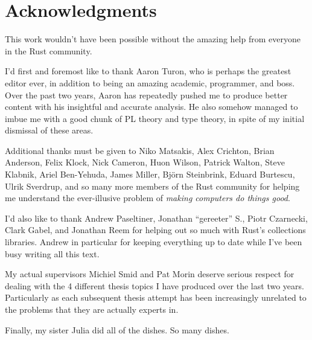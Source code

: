 {}


\bigskip

\begingroup
\let\clearpage\relax
\let\cleardoublepage\relax
\let\cleardoublepage\relax
\chapter*{Acknowledgments}

This work wouldn't have been possible without the amazing help from everyone in
the Rust community.

I'd first and foremost like to thank Aaron Turon, who is perhaps the greatest
editor ever, in addition to being an amazing academic, programmer, and boss.
Over the past two years, Aaron has repeatedly pushed me to produce better content
with his insightful and accurate analysis. He also somehow managed to imbue me with
a good chunk of PL theory and type theory, in spite of my initial dismissal of these
areas.

Additional thanks must be given to Niko Matsakis, Alex Crichton, Brian Anderson,
Felix Klock, Nick Cameron, Huon Wilson, Patrick Walton, Steve Klabnik, Ariel Ben-Yehuda,
James Miller, Björn Steinbrink, Eduard Burtescu, Ulrik Sverdrup, and so many more members of the
Rust community for helping me understand the ever-illusive problem of
\emph{making computers do things good}.

I'd also like to thank Andrew Paseltiner, Jonathan ``gereeter'' S., Piotr Czarnecki,
Clark Gabel, and Jonathan Reem for helping out so much with Rust's collections
libraries. Andrew in particular for keeping everything up to date while I've been
busy writing all this text.

My actual supervisors Michiel Smid and Pat Morin deserve serious respect for
dealing with the 4 different thesis topics I have produced over the last
two years. Particularly as each subsequent thesis attempt has been increasingly
unrelated to the problems that they are actually experts in.

Finally, my sister Julia did all of the dishes. So many dishes.


\endgroup



